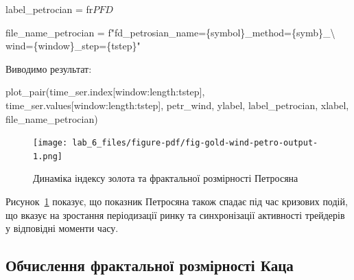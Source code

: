 \documentclass[
  letterpaper,
]{report}
\newenvironment{Shaded}{\begin{snugshade}}{\end{snugshade}}
\newcommand{\CharTok}[1]{\textcolor[rgb]{0.13,0.47,0.30}{#1}}
\newcommand{\NormalTok}[1]{\textcolor[rgb]{0.00,0.23,0.31}{#1}}
\newcommand{\OperatorTok}[1]{\textcolor[rgb]{0.37,0.37,0.37}{#1}}
\newcommand{\SpecialCharTok}[1]{\textcolor[rgb]{0.37,0.37,0.37}{#1}}
\newcommand{\SpecialStringTok}[1]{\textcolor[rgb]{0.13,0.47,0.30}{#1}}
\newcommand{\VerbatimStringTok}[1]{\textcolor[rgb]{0.13,0.47,0.30}{#1}}
\begin{document}
\begin{Shaded}
\begin{Highlighting}[]
\NormalTok{label\_petrocian }\OperatorTok{=} \VerbatimStringTok{fr\textquotesingle{}$PFD$\textquotesingle{}}

\NormalTok{file\_name\_petrocian }\OperatorTok{=} \SpecialStringTok{f"fd\_petrosian\_name=}\SpecialCharTok{\{}\NormalTok{symbol}\SpecialCharTok{\}}\SpecialStringTok{\_method=}\SpecialCharTok{\{}\NormalTok{symb}\SpecialCharTok{\}}\SpecialStringTok{\_}\CharTok{\textbackslash{}}
\SpecialStringTok{           wind=}\SpecialCharTok{\{}\NormalTok{window}\SpecialCharTok{\}}\SpecialStringTok{\_step=}\SpecialCharTok{\{}\NormalTok{tstep}\SpecialCharTok{\}}\SpecialStringTok{"}
\end{Highlighting}
\end{Shaded}

Виводимо результат:

\begin{Shaded}
\begin{Highlighting}[]
\NormalTok{plot\_pair(time\_ser.index[window:length:tstep],}
\NormalTok{          time\_ser.values[window:length:tstep],}
\NormalTok{          petr\_wind, }
\NormalTok{          ylabel, }
\NormalTok{          label\_petrocian,}
\NormalTok{          xlabel,}
\NormalTok{          file\_name\_petrocian)}
\end{Highlighting}
\end{Shaded}

\begin{figure}[H]

{\centering \texttt{[image: lab\_6\_files/figure-pdf/fig-gold-wind-petro-output-1.png]}

}

\caption{\label{fig-gold-wind-petro}Динаміка індексу золота та
фрактальної розмірності Петросяна}

\end{figure}

Рисунок~\ref{fig-gold-wind-petro} показує, що показник Петросяна також
спадає під час кризових подій, що вказує на зростання періодизації ринку
та синхронізації активності трейдерів у відповідні моменти часу.

\hypertarget{ux43eux431ux447ux438ux441ux43bux435ux43dux43dux44f-ux444ux440ux430ux43aux442ux430ux43bux44cux43dux43eux457-ux440ux43eux437ux43cux456ux440ux43dux43eux441ux442ux456-ux43aux430ux446ux430}{%
\subsection{Обчислення фрактальної розмірності
Каца}\label{ux43eux431ux447ux438ux441ux43bux435ux43dux43dux44f-ux444ux440ux430ux43aux442ux430ux43bux44cux43dux43eux457-ux440ux43eux437ux43cux456ux440ux43dux43eux441ux442ux456-ux43aux430ux446ux430}}
\end{document}

